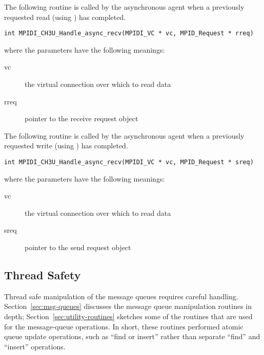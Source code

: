 \documentclass{article}
\begin{document}
The following routine is called by the asynchronous agent when a previously
requested read (using ) has completed.

\begin{verbatim}
int MPIDI_CH3U_Handle_async_recv(MPIDI_VC * vc, MPID_Request * rreq)
\end{verbatim}
where the parameters have the following meanings:
\begin{description}
\item[vc]the virtual connection over which to read data

\item[rreq]pointer to the receive request object
\end{description}

The following routine is called by the asynchronous agent when a previously
requested write (using ) has completed.

\begin{verbatim}
int MPIDI_CH3U_Handle_async_recv(MPIDI_VC * vc, MPID_Request * sreq)
\end{verbatim}
where the parameters have the following meanings:
\begin{description}
\item[vc]the virtual connection over which to read data

\item[sreq]pointer to the send request object
\end{description}

\subsection{Thread Safety}


Thread safe manipulation of the message queues requires careful
handling.  Section~\ref{sec:msg-queues} discusses the message queue
manipulation routines in depth; Section~\ref{sec:utility-routines}
sketches some of the routines that are used for the message-queue
operations.  In short, these routines performed atomic queue update
operations, such as ``find or insert'' rather
than separate ``find'' and ``insert'' operations.

\end{document}
